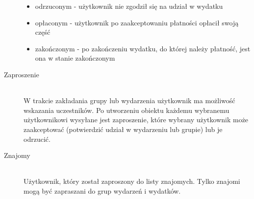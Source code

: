 \begin{description}
\begin{itemize}
    \item odrzuconym - użytkownik nie zgodził się na udział w wydatku
    \item opłaconym - użytkownik po zaakceptowaniu płatności opłacił swoją część
    \item zakończonym - po zakończeniu wydatku, do której należy płatność, jest ona w stanie zakończonym
  \end{itemize}
\item[Zaproszenie] \hfill \\ W trakcie zakładania grupy lub wydarzenia użytkownik ma możliwość wskazania uczestników. Po utworzeniu obiektu każdemu wybranemu użytkownikowi wysyłane jest zaproszenie, które wybrany użytkownik może zaakceptować (potwierdzić udział w wydarzeniu lub grupie) lub je odrzucić.
\item[Znajomy] \hfill \\ Użytkownik, który został zaproszony do listy znajomych. Tylko znajomi mogą być zapraszani do grup wydarzeń i wydatków.
\end{description}


